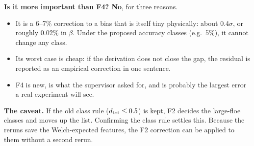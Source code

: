 \documentclass[10pt,a4paper]{article}
\begin{document}
\textbf{Is it more important than F4? No}, for three reasons.
\begin{itemize}
\item It is a 6--7\% correction to a bias that is itself tiny physically: about 0.4$\sigma$, or roughly 0.02\% in $\beta$. Under the proposed accuracy classes (e.g.\ 5\%), it cannot change any class.
\item Its worst case is cheap: if the derivation does not close the gap, the residual is reported as an empirical correction in one sentence.
\item F4 is new, is what the supervisor asked for, and is probably the largest error a real experiment will see.
\end{itemize}
\textbf{The caveat.} If the old class rule ($d_{\rm tot}\le0.5$) is kept, F2 decides the large-floe classes and moves up the list. Confirming the class rule settles this. Because the reruns save the Welch-expected features, the F2 correction can be applied to them without a second rerun.
\end{document}

